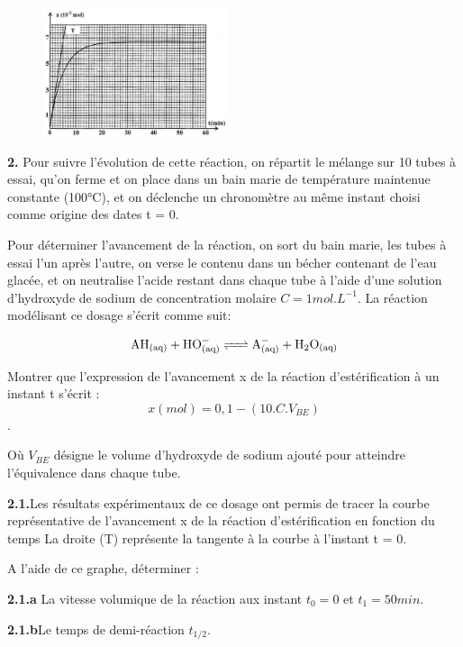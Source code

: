 \documentclass[12pt, french]{article}
\begin{document}
\begin{figure}
  \begin{center}
	  \vspace{-1.2cm}
	\includegraphics[width=0.48\textwidth]{./img/ex04.png}
  \end{center}
\end{figure}



\textbf{2. }Pour suivre l’évolution de cette réaction, on répartit le mélange sur 10 tubes à essai, qu’on ferme et
on place dans un bain marie de température maintenue constante (100°C), et on déclenche un
chronomètre au même instant choisi comme origine des dates t = 0.

Pour déterminer l’avancement de la réaction, on sort du bain marie, les tubes à essai l’un après
l’autre, on verse le contenu dans un bécher contenant de l’eau glacée, et on neutralise l’acide restant
dans chaque tube à l’aide d’une solution d’hydroxyde de sodium de concentration molaire $C = 1mol.L^{-1}$. La réaction modélisant ce dosage s’écrit comme suit:

$$\ce{AH_{(aq)} + HO^-_{(aq)} <=> A^-_{(aq)} + H_2O_{(aq)}}$$

Montrer que l’expression de l’avancement x de la réaction d’estérification à un instant t s’écrit : $$x(mol)=0,1 - (10.C.V_{BE})$$.

\vspace{-0.8cm}
Où $V_{BE}$ désigne le volume d’hydroxyde de sodium
ajouté pour atteindre l’équivalence dans chaque tube.

\textbf{2.1.}Les résultats expérimentaux de ce dosage ont
permis de tracer la courbe représentative de
l’avancement x de la réaction d’estérification
en fonction du temps
La droite (T) représente la tangente à la courbe
à l’instant t = 0.

A l’aide de ce graphe, déterminer :

\textbf{2.1.a }La vitesse volumique de la réaction
aux instant $t_0 = 0$ et $t_1 = 50 min$.

\textbf{2.1.b}Le temps de demi-réaction $t_{1/2}$.
\end{document}
